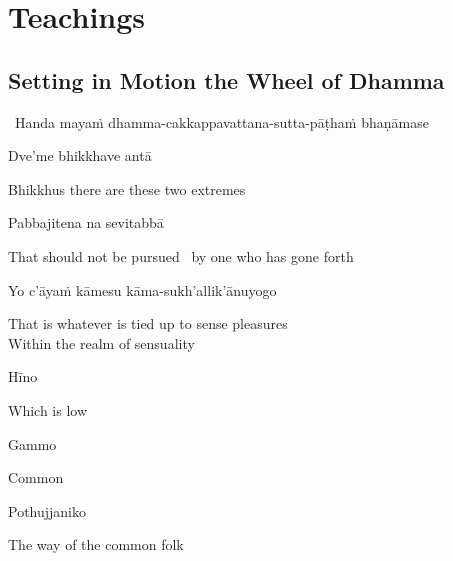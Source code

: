 \ifdesktopversion
{}
\else
{}
\fi

\chapter{Teachings}

\section{Setting in Motion the Wheel of Dhamma}
\label{wheel-of-dhamma-abridged}

\begin{leader}
  \anglebracketleft\ \hspace{-0.5mm}Handa mayaṁ dhamma-cakkappavattana-sutta-pāṭhaṁ bhaṇāmase \hspace{-0.5mm}\anglebracketright\
\end{leader}

Dve'me bhikkhave antā

\begin{english}
  Bhikkhus there are these two extremes
\end{english}

Pabbajitena na sevitabbā

\begin{english}
  That should not be pursued \breathmark\ by one who has gone forth
\end{english}

Yo c'āyaṁ kāmesu kāma-sukh'allik'ānuyogo

\begin{english}
  That is whatever is tied up to sense pleasures\\
  Within the realm of sensuality
\end{english}

Hīno

\begin{english}
  Which is low
\end{english}

Gammo

\begin{english}
  Common
\end{english}

Pothujjaniko

\begin{english}
  The way of the common folk
\end{english}

